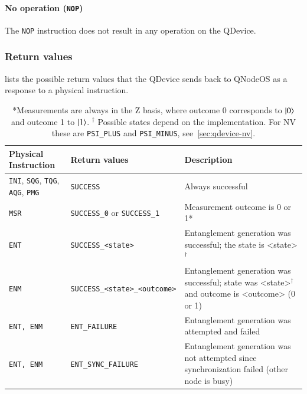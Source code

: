 \paragraph{No operation (\texttt{NOP})}

The \texttt{NOP} instruction does not result in any operation on the \ac{QDevice}.

\subsubsection{Return values}
 lists the possible return values that the QDevice sends back to QNodeOS as a response to a physical instruction.

\begin{table}[htpb]
    \centering
    \begin{tabularx}{\textwidth}{|l|l|X|}
    \hline
    Physical Instruction & Return values & Description \\ 
    \hline
    \texttt{INI}, \texttt{SQG}, \texttt{TQG}, \texttt{AQG}, \texttt{PMG} & \texttt{SUCCESS} & Always successful \\
    \texttt{MSR} & \texttt{SUCCESS\_0} or \texttt{SUCCESS\_1} & Measurement outcome is 0 or 1* \\ 
    \texttt{ENT} & \texttt{SUCCESS\_<state>} & Entanglement generation was successful; the state is <state>$^\dagger$ \\
    \texttt{ENM} & \texttt{SUCCESS\_<state>\_<outcome>} & Entanglement generation was successful; state was <state>$^\dagger$ and outcome is <outcome> (0 or 1) \\
    \texttt{ENT, ENM} & \texttt{ENT\_FAILURE} & Entanglement generation was attempted and failed \\
    \texttt{ENT, ENM} & \texttt{ENT\_SYNC\_FAILURE} & Entanglement generation was not attempted since synchronization failed (other node is busy) \\
    \hline
    \end{tabularx}
    \caption{*Measurements are always in the Z basis, where outcome 0 corresponds to $\ket{0}$ and outcome 1 to $\ket{1}$. $^\dagger$ Possible states depend on the implementation. For NV these are \texttt{PSI\_PLUS} and \texttt{PSI\_MINUS}, see~\cref{sec:qdevice-nv}.}
    \label{tab:qdevice-return-values}
\end{table}
